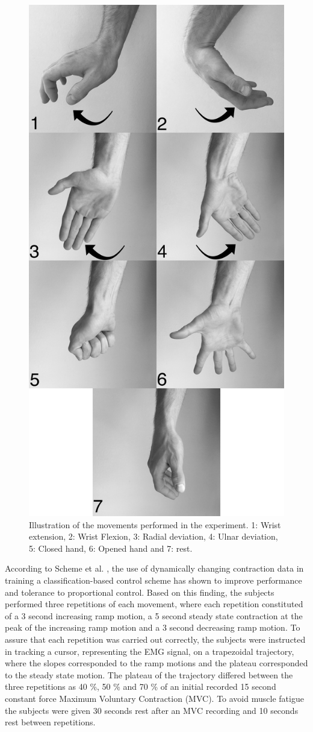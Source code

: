 \begin{figure}[H]                 
	\includegraphics[width=.6\textwidth]{figures/Paper/allHandMovementsVerticalBW}  
	\caption{Illustration of the movements performed in the experiment. 1: Wrist extension, 2: Wrist Flexion, 3: Radial deviation, 4: Ulnar deviation, 5: Closed hand, 6: Opened hand and 7: rest.}
	\label{fig:P:experiment_movements} 
\end{figure}

According to Scheme et al. \cite{Scheme2015}, the use of dynamically changing contraction data in training a classification-based control scheme has shown to improve performance and tolerance to proportional control. Based on this finding, the subjects performed three repetitions of each movement, where each repetition constituted of a 3 second increasing ramp motion, a 5 second steady state contraction at the peak of the increasing ramp motion and a 3 second decreasing ramp motion. To assure that each repetition was carried out correctly, the subjects were instructed in tracking a cursor, representing the EMG signal, on a trapezoidal trajectory, where the slopes corresponded to the ramp motions and the plateau corresponded to the steady state motion. The plateau of the trajectory differed between the three repetitions as 40 \%, 50 \% and 70 \% of an initial recorded 15 second constant force Maximum Voluntary Contraction (MVC). To avoid muscle fatigue the subjects were given 30 seconds rest after an MVC recording and 10 seconds rest between repetitions. 